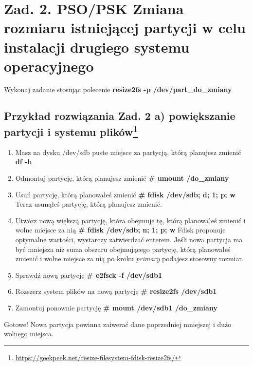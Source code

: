 \documentclass[a4paper,titlepage,12pt]{mwart}
\begin{document}
\section{Zad. 2. PSO/PSK Zmiana rozmiaru istniejącej partycji w celu instalacji drugiego systemu operacyjnego}
Wykonaj zadanie stosując polecenie \textbf{resize2fs -p /dev/part\_do\_zmiany}
\subsection{Przykład rozwiązania Zad. 2 a) powiększanie partycji i systemu plików\footnote{\url{https://geekpeek.net/resize-filesystem-fdisk-resize2fs/}}}
\begin{enumerate}
\item{Masz na dysku /dev/sdb puste miejsce za partycją, którą planujesz zmienić}
\textbf{df -h}
\item{Odmontuj partycję, którą planujesz zmienić}
\textbf{# umount /do_zmiany}
\item{Usuń partycję, którą planowałeś zmienić}
\textbf{# fdisk /dev/sdb; d; 1; p; w}
Teraz usunąłeś partycję, którą planujesz zmienić.
\item{Utwórz nową większą partycję, która obejmuje tę, którą planowałeś zmienić i wolne miejsce za nią}
\textbf{# fdisk /dev/sdb; n; 1; p; w}
Fdisk proponuje optymalne wartości, wystarczy zatwierdzać enterem. Jeśli nowa partycja ma być mniejsza niż suma obszaru obejmującego partycję, którą planowałeś zmienić i wolne miejsce za nią po kroku \textit{primary} podajesz stosowny rozmiar.
\item{Sprawdź nową partycję}
\textbf{# e2fsck -f /dev/sdb1}
\item{Rozszerz system plików na nową partycję}
\textbf{# resize2fs /dev/sdb1}
\item{Zamontuj ponownie partycję}
\textbf{# mount /dev/sdb1 /do_zmiany}
\end{enumerate}
Gotowe! Nowa partycja powinna zaiwerać dane poprzedniej mniejszej i dużo wolnego miejsca.
\end{document}
